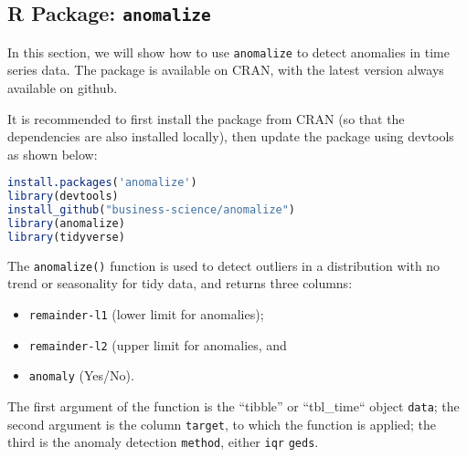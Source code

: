 \subsection{R Package: \texttt{anomalize}} In this section, we will show how to use  \verb|anomalize| to detect anomalies in time series data. The package is available on CRAN, with the latest version always available on github. \par It is recommended to first install the package from CRAN (so that the dependencies are also installed locally), then update the package using devtools as shown below:

\begin{lstlisting}[language=R]
install.packages('anomalize')
library(devtools)
install_github("business-science/anomalize")
library(anomalize)
library(tidyverse)
\end{lstlisting}
\newpage\noindent
The \verb|anomalize()| function is used to detect outliers in a distribution with no trend or seasonality for tidy data, and returns three columns: 
\begin{itemize}[noitemsep]
\item \texttt{remainder-l1} (lower limit for anomalies);
\item \texttt{remainder-l2} (upper limit for anomalies, and 
\item \texttt{anomaly} (Yes/No).
\end{itemize}
The first argument of the function is the ``tibble'' or ``tbl\_time`` object \verb|data|; the second argument is the column \verb|target|, to which the function is applied; the third is the anomaly detection \verb|method|, either \verb|iqr| \verb|geds|. 
